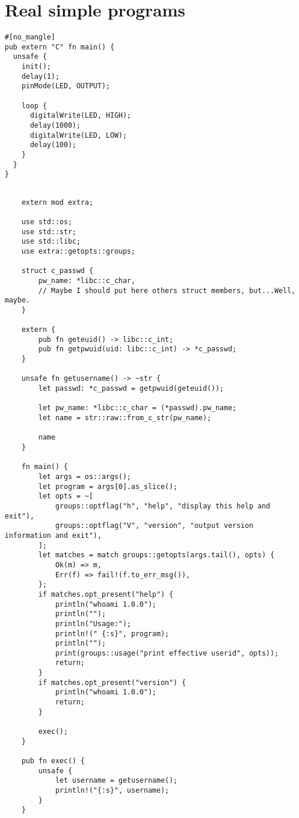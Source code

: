 \documentclass{beamer}
\begin{document}
\section{Real simple programs}

\begin{frame}
  \begin{verbatim}
#[no_mangle]
pub extern "C" fn main() {
  unsafe {
    init();
    delay(1);
    pinMode(LED, OUTPUT);

    loop {
      digitalWrite(LED, HIGH);
      delay(1000);
      digitalWrite(LED, LOW);
      delay(100);
    }
  }
}
  \end{verbatim}
\end{frame}



\begin{frame}
  \begin{verbatim}

    extern mod extra;

    use std::os;
    use std::str;
    use std::libc;
    use extra::getopts::groups;

    struct c_passwd {
        pw_name: *libc::c_char,
        // Maybe I should put here others struct members, but...Well, maybe.
    }

    extern {
        pub fn geteuid() -> libc::c_int;
        pub fn getpwuid(uid: libc::c_int) -> *c_passwd;
    }

    unsafe fn getusername() -> ~str {
        let passwd: *c_passwd = getpwuid(geteuid());

        let pw_name: *libc::c_char = (*passwd).pw_name;
        let name = str::raw::from_c_str(pw_name);

        name
    }

    fn main() {
        let args = os::args();
        let program = args[0].as_slice();
        let opts = ~[
            groups::optflag("h", "help", "display this help and exit"),
            groups::optflag("V", "version", "output version information and exit"),
        ];
        let matches = match groups::getopts(args.tail(), opts) {
            Ok(m) => m,
            Err(f) => fail!(f.to_err_msg()),
        };
        if matches.opt_present("help") {
            println("whoami 1.0.0");
            println("");
            println("Usage:");
            println!(" {:s}", program);
            println("");
            print(groups::usage("print effective userid", opts));
            return;
        }
        if matches.opt_present("version") {
            println("whoami 1.0.0");
            return;
        }

        exec();
    }

    pub fn exec() {
        unsafe {
            let username = getusername();
            println!("{:s}", username);
        }
    }
  \end{verbatim}
\end{frame}
\end{document}
